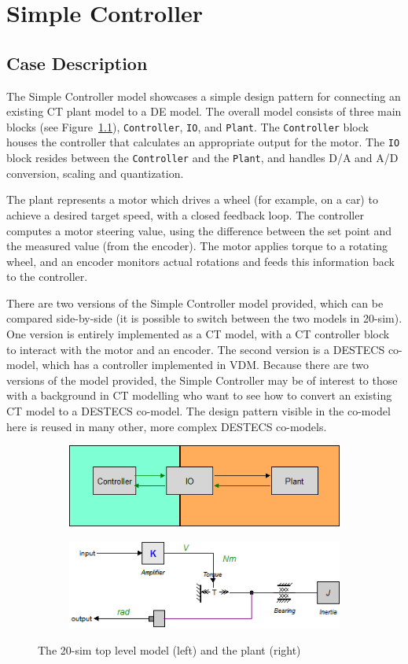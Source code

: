 \chapter{Simple Controller} \label{chap:controllerPattern}
\section{Case Description}

The Simple Controller model showcases a simple design pattern for
connecting an existing CT plant model to a DE model. 
The overall model consists of three main blocks (see Figure~\ref{fig:20simmotor}),
\texttt{Controller}, \texttt{IO}, and \texttt{Plant}. The
\texttt{Controller} block houses the controller that calculates an
appropriate output for the motor. The \texttt{IO} block
resides between the \texttt{Controller} and the \texttt{Plant}, and
handles D/A and A/D conversion, scaling and quantization.

The plant represents a motor which drives a wheel (for example,
on a car) to achieve a desired target speed, with a closed feedback
loop. The controller computes a motor steering value, using the difference between the set point and the measured value (from the encoder). 
The motor applies torque to a rotating wheel, and an encoder monitors actual rotations and feeds this information back to the controller.  

There are two versions of the Simple Controller model provided, which can be
compared side-by-side (it is possible to switch between the two models
in 20-sim).  One version is entirely implemented as a CT model, with a
CT controller block to interact with the motor and an encoder.  
The second version is a DESTECS co-model, which has a controller
implemented in VDM.  Because there are two versions of the model
provided, the Simple Controller may be of interest to those with a
background in CT modelling who want to see how to convert an existing
CT model to a DESTECS co-model. The design pattern visible in the
co-model here is reused in many other, more complex DESTECS co-models.

\begin{figure}[!ht]
\begin{subfigure}
\centering
\includegraphics[width=0.5\linewidth]{controllerPattern/toplevel}
\end{subfigure}
\begin{subfigure}
\centering
\includegraphics[width=0.45\linewidth]{controllerPattern/plant}
\end{subfigure}
\caption{The 20-sim top level model (left) and the plant (right)}
\label{fig:20simmotor}
\end{figure}

